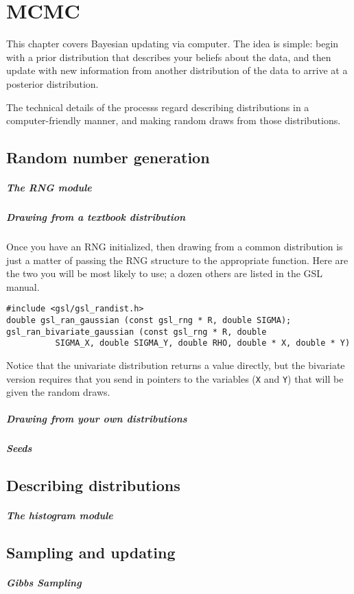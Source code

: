 \startonecol \chapter{MCMC} \endonecol

This chapter covers Bayesian updating via computer. The idea is simple: begin with a prior
distribution that describes your beliefs about the data, and then update with new
information from another distribution of the data to arrive at a posterior distribution.

The technical details of the processs regard describing distributions
in a computer-friendly manner, and making random draws from those distributions.

\section{Random number generation}

\paragraph{The RNG module}

\paragraph{Drawing from a textbook distribution}
\label{randomnumbers}
Once you have an RNG initialized, then drawing from a common distribution is just a matter
of passing the RNG structure to the appropriate function. Here are the two you will be most
likely to use; a dozen others are listed in the GSL manual.
\begin{verbatim}
#include <gsl/gsl_randist.h>
double gsl_ran_gaussian (const gsl_rng * R, double SIGMA);
gsl_ran_bivariate_gaussian (const gsl_rng * R, double
          SIGMA_X, double SIGMA_Y, double RHO, double * X, double * Y)
\end{verbatim}
Notice that the univariate distribution returns a value directly, but
the bivariate version requires that you send in pointers to the variables
({\tt X} and {\tt Y}) that will be given the random draws.

\paragraph{Drawing from your own distributions}


\paragraph{Seeds}

\section{Describing distributions}

\paragraph{The histogram module}

\section{Sampling and updating}



\paragraph{Gibbs Sampling}

